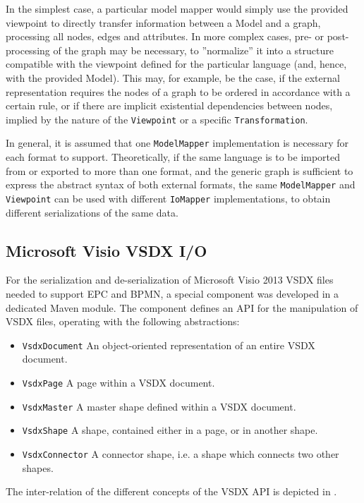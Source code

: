 In the simplest case, a particular model mapper would simply use the provided viewpoint to directly transfer information between a Model and a graph, processing all nodes, edges and attributes. In more complex cases, pre- or post-processing of the graph may be necessary, to ''normalize'' it into a structure compatible with the viewpoint defined for the particular language (and, hence, with the provided Model). This may, for example, be the case, if the external representation requires the nodes of a graph to be ordered in accordance with a certain rule, or if there are implicit existential dependencies between nodes, implied by the nature of the \texttt{Viewpoint} or a specific \texttt{Transformation}.

In general, it is assumed that one \texttt{ModelMapper} implementation is necessary for each format to support. Theoretically, if the same language is to be imported from or exported to more than one format, and the generic graph is sufficient to express the abstract syntax of both external formats, the same \texttt{ModelMapper} and \texttt{Viewpoint} can be used with different \texttt{IoMapper} implementations, to obtain different serializations of the same data.

\subsection{Microsoft Visio VSDX I/O}

For the serialization and de-serialization of Microsoft Visio 2013 VSDX files needed to support EPC and BPMN, a special component was developed in a dedicated Maven module. The component defines an API for the manipulation of VSDX files, operating with the following abstractions:

\begin{itemize}
\item \texttt{VsdxDocument} An object-oriented representation of an entire VSDX document.
\item \texttt{VsdxPage} A page within a VSDX document.
\item \texttt{VsdxMaster} A master shape defined within a VSDX document.
\item \texttt{VsdxShape} A shape, contained either in a page, or in another shape.
\item \texttt{VsdxConnector} A connector shape, i.e. a shape which connects two other shapes.
\end{itemize}

The inter-relation of the different concepts of the VSDX API is depicted in .

